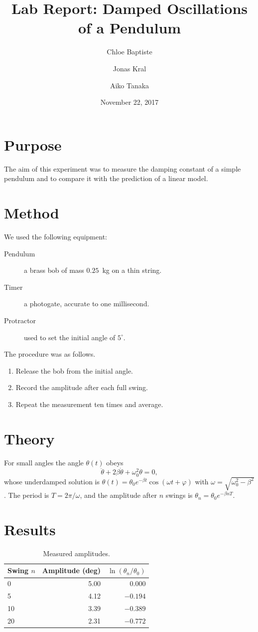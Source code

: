 \documentclass[10pt,a4paper]{article}
\title{Lab Report: Damped Oscillations of a Pendulum}
\author{Chloe Baptiste \and Jonas Kral \and Aiko Tanaka}
\date{November 22, 2017}
\begin{document}
\maketitle

\section{Purpose}
The aim of this experiment was to measure the damping constant of a simple pendulum and to compare it with the prediction of a linear model.

\section{Method}
We used the following equipment:
\begin{description}
  \item[Pendulum] a brass bob of mass $0.25$~kg on a thin string.
  \item[Timer] a photogate, accurate to one millisecond.
  \item[Protractor] used to set the initial angle of $5^\circ$.
\end{description}
The procedure was as follows.
\begin{enumerate}
  \item Release the bob from the initial angle.
  \item Record the amplitude after each full swing.
  \item Repeat the measurement ten times and average.
\end{enumerate}

\section{Theory}
For small angles the angle $\theta(t)$ obeys
\begin{equation}
  \ddot\theta + 2\beta\dot\theta + \omega_0^2\theta = 0,
\end{equation}
whose underdamped solution is $\theta(t)=\theta_0 e^{-\beta t}\cos(\omega t+\varphi)$ with $\omega=\sqrt{\omega_0^2-\beta^2}$. The period is $T=2\pi/\omega$, and the amplitude after $n$ swings is $\theta_n=\theta_0e^{-\beta nT}$.

\section{Results}
\begin{table}[htbp]
\centering
\begin{tabular}{lrr}
\hline
Swing $n$ & Amplitude (deg) & $\ln(\theta_n/\theta_0)$\\
\hline
0 & 5.00 & 0.000\\
5 & 4.12 & $-0.194$\\
10 & 3.39 & $-0.389$\\
20 & 2.31 & $-0.772$\\
\hline
\end{tabular}
\caption{Measured amplitudes.}
\label{tab:amp}
\end{table}
\end{document}
